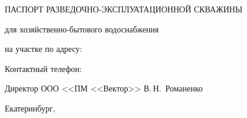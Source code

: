 \begin{titlepage}
	\begin{center}
		\textbf{\txtExecutor}
		\vspace{5.5cm}
		
		{\LARGE ПАСПОРТ РАЗВЕДОЧНО-ЭКСПЛУАТАЦИОННОЙ СКВАЖИНЫ}
		\vspace{0.25cm}
		
		для хозяйственно-бытового водоснабжения
		
		\bigskip
		
		на участке по адресу:

		\bigskip				
		\textit{\txtAddress}
	
		\bigskip
		\bigskip

		Контактный телефон: \txtPhoneNumber
		
		\vfill
	
		\bigskip
		
	\end{center}

	\vfill
	
	\newlength{\ML}
	\hfill
	\begin{minipage}{1.0\textwidth}
		Директор ООО <<ПМ <<Вектор>> 
		\underline{\hspace{\ML}} В.\,Н.~Романенко\\

	\end{minipage}%
	
	\bigskip
	
	\vfill
	\begin{center}
		Екатеринбург, \txtYear
	\end{center}			

	\end{titlepage}


